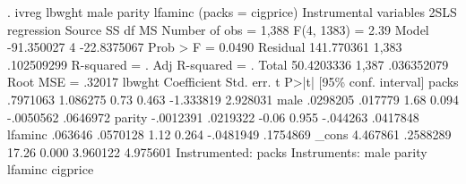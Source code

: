 . ivreg lbwght male parity lfaminc (packs = cigprice)
{\smallskip}
Instrumental variables 2SLS regression
{\smallskip}
      Source {\VBAR}       SS           df       MS      Number of obs   =     1,388
   F(4, 1383)      =      2.39
       Model {\VBAR}  -91.350027         4 -22.8375067   Prob > F        =    0.0490
    Residual {\VBAR}  141.770361     1,383  .102509299   R-squared       =         .
   Adj R-squared   =         .
       Total {\VBAR}  50.4203336     1,387  .036352079   Root MSE        =    .32017
{\smallskip}
      lbwght {\VBAR} Coefficient  Std. err.      t    P>|t|     [95\% conf. interval]
       packs {\VBAR}   .7971063   1.086275     0.73   0.463    -1.333819    2.928031
        male {\VBAR}   .0298205    .017779     1.68   0.094    -.0050562    .0646972
      parity {\VBAR}  -.0012391   .0219322    -0.06   0.955     -.044263    .0417848
     lfaminc {\VBAR}    .063646   .0570128     1.12   0.264    -.0481949    .1754869
       _cons {\VBAR}   4.467861   .2588289    17.26   0.000     3.960122    4.975601
Instrumented: packs
 Instruments: male parity lfaminc cigprice
{\smallskip}
